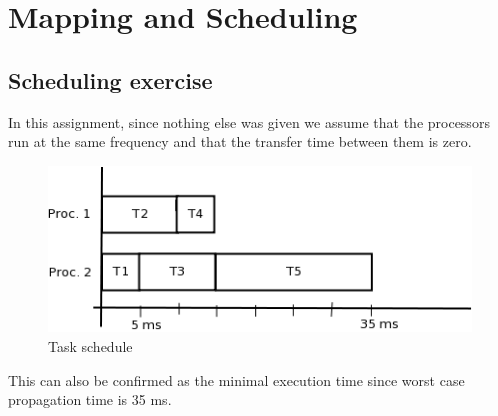 \documentclass[a4paper, 12pt]{article}
\begin{document}
\section{Mapping and Scheduling}
\subsection{Scheduling exercise}
In this assignment, since nothing else was given we assume that the
processors run at the same frequency and that the transfer time between
them is zero.
\begin{figure}[h]
  \centering
  \includegraphics{taskSchedule.png}
  \caption{Task schedule}
  \label{fig:schedule}
\end{figure}
 This can also be confirmed as the minimal execution time since worst
 case propagation time is 35 ms. 
\end{document}
